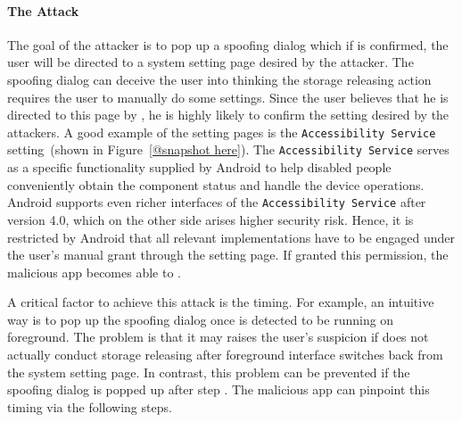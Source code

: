 
\paragraph{The Attack}
The goal of the attacker is to pop up a spoofing dialog which if is confirmed, 
the user will be directed to a system setting page desired by the attacker. 
The spoofing dialog can deceive the user into thinking the storage releasing action requires the 
user to manually do some settings. 
Since the user believes that he is directed to this page by \du, he is highly likely to 
confirm the setting desired by the attackers. 
A good example of the setting pages is the \texttt{Accessibility Service} setting~(shown in Figure~\ref{@snapshot here}). 
The \texttt{Accessibility Service} serves as a specific functionality supplied by Android to help disabled people conveniently 
obtain the component status and handle the device operations. 
Android supports even richer interfaces of the \texttt{Accessibility Service} after version 4.0, which on the other side arises higher security risk. 
Hence, it is restricted by Android that all relevant implementations have to be engaged under the user's manual grant through the setting page.
If granted this permission, the malicious app becomes able to . 

A critical factor to achieve this attack is the timing. 
For example, an intuitive way is to pop up the spoofing dialog once \du is detected to be running on foreground. 
The problem is that it may raises the user's suspicion if \du does not actually conduct storage releasing after foreground interface switches back 
from the system setting page. 
In contrast, this problem can be prevented if the spoofing dialog is popped up after step . 
The malicious app can pinpoint this timing via the following steps. 

